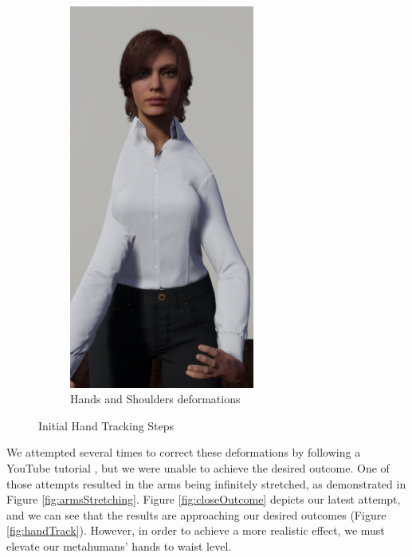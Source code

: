 \begin{figure}[!htb]
\begin{minipage}{\linewidth}
        \begin{subfigure}{0.49\textwidth}
            \includegraphics[width=0.67\textwidth]{figures/FirstInteraction.png}
            \centering
            \caption{Hands and Shoulders deformations}
        \end{subfigure}
        \caption{Initial Hand Tracking Steps}
        \label{fig:initialSteps}
	\end{minipage}
\end{figure}

We attempted several times to correct these deformations by following a YouTube tutorial \cite{TVL}, but we were unable to achieve the desired outcome. One of those attempts resulted in the arms being infinitely stretched, as demonstrated in Figure \ref{fig:armsStretching}. Figure \ref{fig:closeOutcome} depicts our latest attempt, and we can see that the results are approaching our desired outcomes (Figure \ref{fig:handTrack}). However, in order to achieve a more realistic effect, we must elevate our metahumans' hands to waist level.


